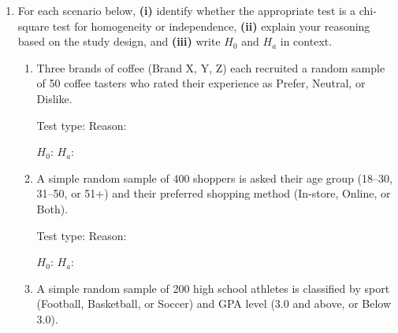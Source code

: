 \documentclass[10pt]{article}
\begin{document}
\namedateperiod

\vspace{0.1in}

\begin{enumerate}

  \item For each scenario below, \textbf{(i)} identify whether the appropriate test is a
        chi-square test for homogeneity or independence, \textbf{(ii)} explain your reasoning
        based on the study design, and \textbf{(iii)} write $H_0$ and $H_a$ in context.

        \begin{enumerate}[label=(\alph*)]

          \item Three brands of coffee (Brand X, Y, Z) each recruited a random sample of
                50 coffee tasters who rated their experience as Prefer, Neutral, or Dislike.

                Test type:  \quad Reason: 

                $H_0$: 
                $H_a$: 

                \vspace{0.06in}

          \item A simple random sample of 400 shoppers is asked their age group (18--30,
                31--50, or 51+) and their preferred shopping method (In-store, Online, or Both).

                Test type:  \quad Reason: 

                $H_0$: 
                $H_a$: 

                \vspace{0.06in}

          \item A simple random sample of 200 high school athletes is classified by sport
                (Football, Basketball, or Soccer) and GPA level (3.0 and above, or Below 3.0).


\end{enumerate}
\end{enumerate}
\end{document}
